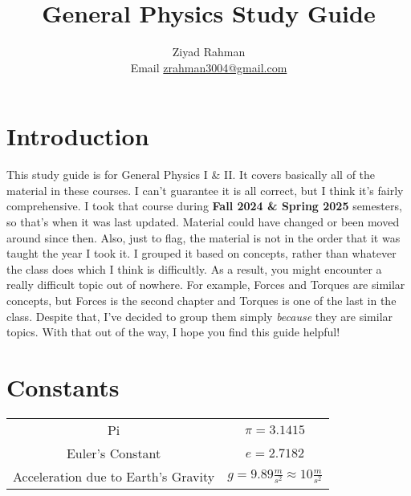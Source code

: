 \documentclass{article}
\title{General Physics Study Guide}
\author{Ziyad Rahman \\ Email \href{zrahman3004@gmail.com}{zrahman3004@gmail.com} }
\date{}
\begin{document}
\maketitle
\tableofcontents

\newpage
\section{Introduction}
This study guide is for General Physics I \& II. It covers basically all of the material in these courses. I can't guarantee it is all correct, but
I think it's fairly comprehensive. I took that course during \textbf{Fall 2024 \& Spring 2025} semesters, so that's when it was last updated. Material
could have changed or been moved around since then. Also, just to flag, the material is not in the order that it was taught the year I took it. I
grouped it based on concepts, rather than whatever the class does which I think is difficultly. As a result, you might encounter a really difficult
topic out of nowhere. For example, Forces and Torques are similar concepts, but Forces is the second chapter and Torques is one of the last in the class.
Despite that, I've decided to group them simply \textit{because} they are similar topics. With that out of the way, I hope you find this guide helpful!

    













\newpage
\appendix

\section{Constants}\label{Appendix A}

\begin{center}
\begin{tabular}{c | c}
    Pi & $\pi = 3.1415$\\
    Euler's Constant & $e = 2.7182$ \\
    Acceleration due to Earth's Gravity & $g = 9.89 \frac{m}{s^2} \approx 10 \frac{m}{s^2}$ \\
\end{tabular}
\end{center}
\end{document}
